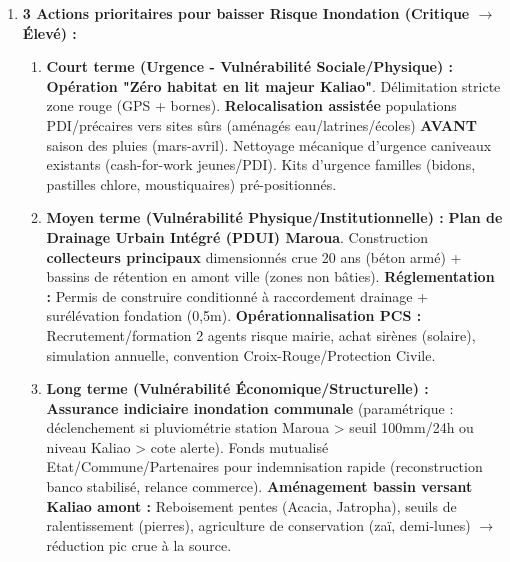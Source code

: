\documentclass[11pt]{article}
\begin{document}
\begin{exoresolu}
\begin{enumerate}
\begin{itemize}
              \item \textbf{Différence :} L'inondation est \textbf{soudaine, destructrice d'actifs physiques (maisons, routes), contaminante (eau sale)}. La sécheresse est \textbf{lente, prévisible} (alertes saisonnières), gérable par ajustement progressif des pratiques. L'inondation détruit le capital physique (maison = actif principal pauvre) ; la sécheresse réduit le flux de revenus/récolte mais l'actif foncier reste. D'où vulnérabilité perçue/réelle plus aiguë pour l'inondation.
          \end{itemize}
    \item \textbf{3 Actions prioritaires pour baisser Risque Inondation (Critique $\rightarrow$ Élevé) :}
          \begin{enumerate}
              \item \textbf{Court terme (Urgence - Vulnérabilité Sociale/Physique) :} \textbf{Opération "Zéro habitat en lit majeur Kaliao"}. Délimitation stricte zone rouge (GPS + bornes). \textbf{Relocalisation assistée} populations PDI/précaires vers sites sûrs (aménagés eau/latrines/écoles) \textbf{AVANT} saison des pluies (mars-avril). Nettoyage mécanique d'urgence caniveaux existants (cash-for-work jeunes/PDI). Kits d'urgence familles (bidons, pastilles chlore, moustiquaires) pré-positionnés.
              \item \textbf{Moyen terme (Vulnérabilité Physique/Institutionnelle) :} \textbf{Plan de Drainage Urbain Intégré (PDUI) Maroua}. Construction \textbf{collecteurs principaux} dimensionnés crue 20 ans (béton armé) + bassins de rétention en amont ville (zones non bâties). \textbf{Réglementation :} Permis de construire conditionné à raccordement drainage + surélévation fondation (0,5m). \textbf{Opérationnalisation PCS :} Recrutement/formation 2 agents risque mairie, achat sirènes (solaire), simulation annuelle, convention Croix-Rouge/Protection Civile.
              \item \textbf{Long terme (Vulnérabilité Économique/Structurelle) :} \textbf{Assurance indiciaire inondation communale} (paramétrique : déclenchement si pluviométrie station Maroua > seuil 100mm/24h ou niveau Kaliao > cote alerte). Fonds mutualisé Etat/Commune/Partenaires pour indemnisation rapide (reconstruction banco stabilisé, relance commerce). \textbf{Aménagement bassin versant Kaliao amont :} Reboisement pentes (Acacia, Jatropha), seuils de ralentissement (pierres), agriculture de conservation (zaï, demi-lunes) $\rightarrow$ réduction pic crue à la source.
          \end{enumerate}

\end{enumerate}
\end{exoresolu}
\end{document}
